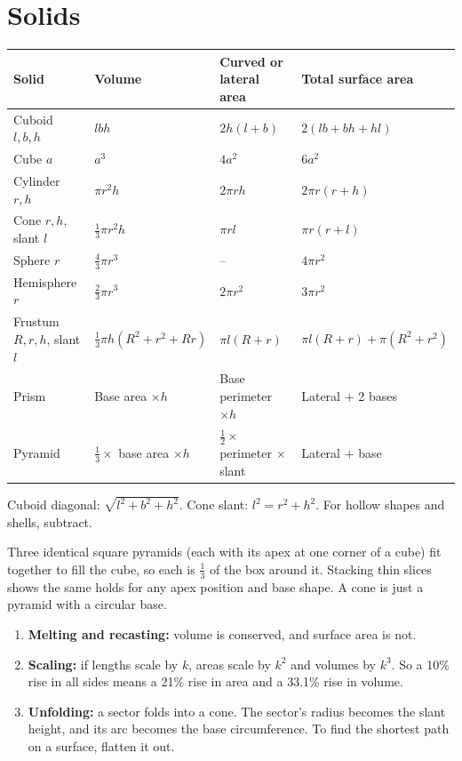 \documentclass[11pt,a4paper,openany]{report}
\begin{document}
\section{Solids}
\begin{center}\small
\begin{tabular}{llll}
\toprule
Solid & Volume & Curved or lateral area & Total surface area\\\midrule
Cuboid $l,b,h$ & $lbh$ & $2h(l+b)$ & $2(lb+bh+hl)$\\
Cube $a$ & $a^3$ & $4a^2$ & $6a^2$\\
Cylinder $r,h$ & $\pi r^2h$ & $2\pi rh$ & $2\pi r(r+h)$\\
Cone $r,h$, slant $l$ & $\frac13\pi r^2h$ & $\pi rl$ & $\pi r(r+l)$\\
Sphere $r$ & $\frac43\pi r^3$ & -- & $4\pi r^2$\\
Hemisphere $r$ & $\frac23\pi r^3$ & $2\pi r^2$ & $3\pi r^2$\\
Frustum $R,r,h$, slant $l$ & $\frac13\pi h(R^2+r^2+Rr)$ & $\pi l(R+r)$ & $\pi l(R+r)+\pi(R^2+r^2)$\\
Prism & Base area $\times h$ & Base perimeter $\times h$ & Lateral $+$ 2 bases\\
Pyramid & $\frac13\times$ base area $\times h$ & $\frac12\times$ perimeter $\times$ slant & Lateral $+$ base\\
\bottomrule
\end{tabular}
\end{center}
Cuboid diagonal: $\sqrt{l^2+b^2+h^2}$. Cone slant: $l^2=r^2+h^2$. For hollow shapes and shells, subtract.

\begin{why}
Three identical square pyramids (each with its apex at one corner of a cube) fit together to fill the cube, so each is $\frac13$ of the box around it. Stacking thin slices shows the same holds for any apex position and base shape. A cone is just a pyramid with a circular base.
\end{why}

\begin{idea}
\begin{enumerate}[nosep]
\item \textbf{Melting and recasting:} volume is conserved, and surface area is not.
\item \textbf{Scaling:} if lengths scale by $k$, areas scale by $k^2$ and volumes by $k^3$. So a 10\% rise in all sides means a 21\% rise in area and a 33.1\% rise in volume.
\item \textbf{Unfolding:} a sector folds into a cone. The sector's radius becomes the slant height, and its arc becomes the base circumference. To find the shortest path on a surface, flatten it out.
\end{enumerate}
\end{idea}
\end{document}

